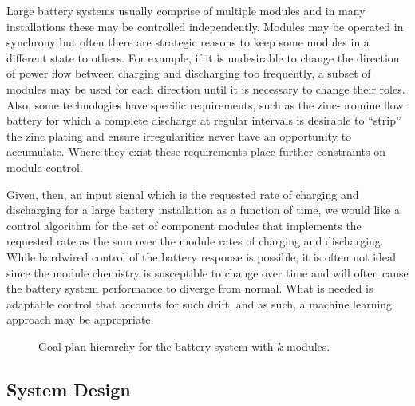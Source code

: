 Large battery systems usually comprise of multiple modules and in many installations these may be controlled independently.  Modules may be operated in synchrony but often there are strategic reasons to keep some modules in a different state to others.  For example, if it is undesirable to change the direction of power flow between charging and discharging too frequently, a subset of modules may be used for each direction until it is necessary to change their roles.  Also, some technologies have specific requirements, such as the zinc-bromine flow battery for which a complete discharge at regular intervals is desirable to ``strip'' the zinc plating and ensure irregularities never have an opportunity to accumulate.  Where they exist these requirements place further constraints on module control.

Given, then, an input signal which is the requested rate of charging and discharging for a large battery installation as a function of time, we would like a control algorithm for the set of component modules that implements the requested rate as the sum over the module rates of charging and discharging.  While hardwired control of the battery response is possible, it is often not ideal since the module chemistry is susceptible to change over time and will often cause the battery system performance to diverge from normal. What is needed is adaptable control that accounts for such drift, and as such, a  machine learning approach may be appropriate. 

\begin{figure*}[ht]
\begin{center}

\end{center}
\caption{Goal-plan hierarchy for the battery system with $k$ modules.}
\label{fig:gptree}
\end{figure*}


\subsection{System Design}\label{subsec:design}

